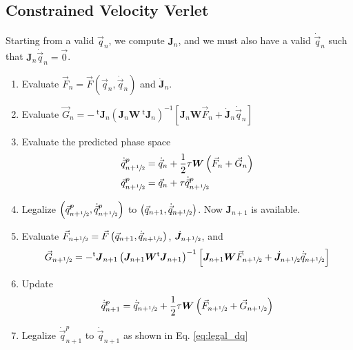 \documentclass[aps,twocolumn]{revtex4}
\newcommand{\mymat}[1]{\boldsymbol{#1}}
\newcommand{\mytrn}[1]{{\!\!~^{\mathsf{t}}{#1}}}
\newcommand{\half}{\sfrac{1}{2}}
\newcommand{\q}{\vec{q}}
\newcommand{\dq}{\dot{\q}}
\newcommand{\J}{\mymat{J}}
\newcommand{\dJ}{\dot{\J}}
\newcommand{\tJ}{\mytrn{\J}}
\newcommand{\G}{\vec{G}}
\newcommand{\W}{\mymat{W}}
\begin{document}
\subsection{Constrained Velocity Verlet}

Starting from a valid $\q_n$, we compute $\J_n$, and we must also have a valid $\dq_n$ such that $\J_n\dq_n=\vec{0}$.

\begin{enumerate}
	\item Evaluate $\vec{F}_n = \vec{F}(\q_n,\dq_n)$ and $\dJ_n$.
	\item Evaluate $\G_n = -\tJ_n \left(\J_n \W \tJ_n \right)^{-1}\left\lbrack \J_n\W\vec{F}_n + \dJ_n \dq_n \right\rbrack$
	\item Evaluate the predicted phase space
	\begin{align*}
	\dq_{n+\half}^p & = \dq_n + \frac{1}{2} \tau \W \left(\vec{F}_n + \G_n \right) \\
	\q_{n+\half}^p  & = \q_{n} + \tau \dq_{n+\half}^p
	\end{align*}
	\item Legalize $\left(\q_{n+\half}^p,\dq_{n+\half}^p\right)$ to $\left(\q_{n+1},\dq_{n+\half}\right)$. Now $\J_{n+1}$ is available.
	\item Evaluate $\vec{F}_{n+\half}=\vec{F}\left(\q_{n+1},\dq_{n+\half}\right)$, $\dJ_{n+\half}$, 
	and 
	$$
	\G_{n+\half}=-\tJ_{n+1} \left(\J_{n+1} \W \tJ_{n+1} \right)^{-1}\left\lbrack \J_{n+1}\W\vec{F}_{n+\half} + \dJ_{n+\half} \dq_{n+\half} \right\rbrack
	$$
	\item Update
	$$
		\dq_{n+1}^{p} = \dq_{n+\half} + \frac{1}{2} \tau \W\left(\vec{F}_{n+\half} + \vec{G}_{n+\half}\right)
	$$
	\item Legalize $\dq_{n+1}^{p}$ to $\dq_{n+1}$ as shown in Eq. \eqref{eq:legal_dq}
\end{enumerate}
\end{document}
